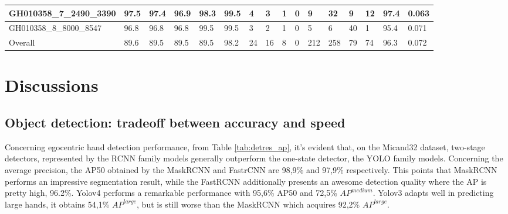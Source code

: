 \begin{table}[]
{\begin{tabular}{|l|l|l|l|l|l|l|l|l|l|l|l|l|l|l|l|}
			GH010358\_7\_2490\_3390   & 97.5       & 97.4      & 96.9      & 98.3                                                   & 99.5                                                   & 4    & 3                                                    & 1                                                    & 0                                                    & 9    & 32   & 9                                                     & 12                                                   & 97.4       & 0.063  \\ \hline
			GH010358\_8\_8000\_8547   & 96.8       & 96.8      & 96.8      & 99.5                                                   & 99.5                                                   & 3    & 2                                                    & 1                                                    & 0                                                    & 5    & 6    & 40                                                    & 1                                                    & 95.4       & 0.071  \\ \hline
			Overall                   & 89.6       & 89.5      & 89.5      & 89.5                                                   & 98.2                                                   & 24   & 16                                                   & 8                                                    & 0                                                    & 212  & 258  & 79                                                    & 74                                                   & 96.3       & 0.072  \\ \hline
		\end{tabular}%
	}
\end{table}
\section{Discussions}
\subsection{Object detection: tradeoff between accuracy and speed}
Concerning egocentric hand detection performance, from Table \ref{tab:detres_ap}, it’s evident that, on the Micand32 dataset, two-stage detectors, represented by the RCNN family models generally outperform the one-state detector, the YOLO family models. Concerning the average precision, the AP50 obtained by the MaskRCNN and FastrCNN are 98,9\% and 97,9\% respectively. This points that MaskRCNN performs an impressive segmentation result, while the FastRCNN additionally presents an awesome detection quality where the AP is pretty high, 96.2\%. Yolov4 performs a remarkable performance with 95,6\% AP50 and 72,5\% \(AP^{medium}\). Yolov3 adapts well in predicting large hands, it obtains 54,1\% \(AP^{large}\), but is still worse than the MaskRCNN which acquires 92,2\% \(AP^{large}\).

